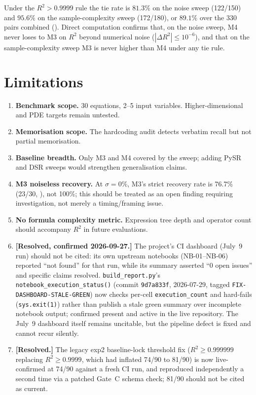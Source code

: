 \documentclass[twoside,11pt]{article}
\newcommand{\Rsq}{R^{2}}
\begin{document}
Under the $\Rsq>0.9999$ rule the tie rate is $81.3\%$ on the noise
sweep (122/150) and $95.6\%$ on the sample-complexity sweep (172/180), or
$89.1\%$ over the 330 pairs combined (). Direct computation
confirms that, on the noise sweep, M4 never loses to M3 on $\Rsq$ beyond
numerical noise ($|\Delta\Rsq|\le10^{-6}$), and that on the sample-complexity
sweep M3 is never higher than M4 under any tie rule.

\section{Limitations}
\label{suppb:limitations}

\begin{enumerate}
  \item \textbf{Benchmark scope.} 30 equations, 2--5 input variables.
    Higher-dimensional and PDE targets remain untested.
  \item \textbf{Memorisation scope.} The hardcoding audit detects verbatim
    recall but not partial memorisation.
  \item \textbf{Baseline breadth.} Only M3 and M4 covered by the sweep;
    adding PySR and DSR sweeps would strengthen generalisation claims.
  \item \textbf{M3 noiseless recovery.}  At $\sigma=0\%$, M3's strict recovery rate is 76.7\%
    (23/30, ), not 100\%; this should be treated as an open finding
    requiring investigation, not merely a timing/framing issue.
  \item \textbf{No formula complexity metric.} Expression tree depth and
    operator count should accompany $\Rsq$ in future evaluations.
  \item \textbf{[Resolved, confirmed 2026-09-27.]} The project's CI
    dashboard (July~9 run) should not be cited: its own upstream notebooks
    (NB-01--NB-06) reported ``not found'' for that run, while its summary
    asserted ``0 open issues'' and specific claims resolved.
    \texttt{build\_report.py}'s \texttt{notebook\_execution\_status()}
    (commit \texttt{9d7a833f}, 2026-07-29, tagged
    \texttt{FIX-DASHBOARD-STALE-GREEN}) now checks per-cell
    \texttt{execution\_count} and hard-fails (\texttt{sys.exit(1)}) rather
    than publish a stale green summary over incomplete notebook output;
    confirmed present and active in the live repository. The July~9
    dashboard itself remains uncitable, but the pipeline defect is fixed
    and cannot recur silently.
  \item \textbf{[Resolved.]} The legacy exp2 baseline-lock threshold
    fix ($R^2 \geq 0.999999$ replacing $R^2 \geq 0.9999$, which had
    inflated 74/90 to 81/90) is now live-confirmed at 74/90 against a
    fresh CI run, and reproduced independently a second time via a
    patched Gate~C schema check; 81/90 should not be cited as current.
\end{enumerate}
\end{document}

